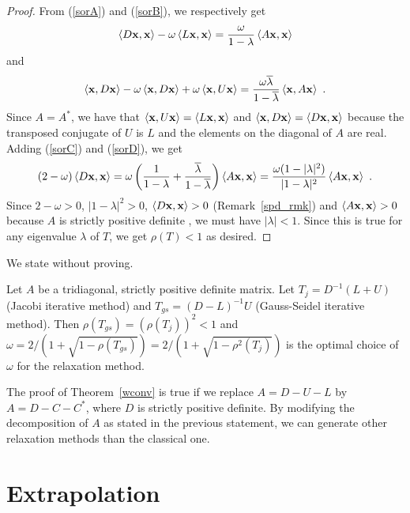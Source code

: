 \begin{proof}
From (\ref{sorA}) and (\ref{sorB}), we respectively get
\begin{equation}\label{sorC}
\left\langle{D\mathbf{x}} , {\mathbf{x}}\right\rangle - \omega \left\langle{L\mathbf{x}} , {\mathbf{x}}\right\rangle
= \frac{\omega}{1-\lambda} \left\langle{A\mathbf{x}} , {\mathbf{x}}\right\rangle
\end{equation}
and
\begin{equation}\label{sorD}
\left\langle{\mathbf{x}} , {D\mathbf{x}}\right\rangle - \omega\left\langle{\mathbf{x}} , {D\mathbf{x}}\right\rangle
+ \omega \left\langle{\mathbf{x}} , {U\mathbf{x}}\right\rangle
= \frac{\omega \overline{\lambda}}{1-\overline{\lambda}}
\left\langle{\mathbf{x}} , {A\mathbf{x}}\right\rangle \ .
\end{equation}
Since $A = A^\ast$, we have that
$\left\langle{\mathbf{x}} , {U\mathbf{x}}\right\rangle = \left\langle{L\mathbf{x}} , {\mathbf{x}}\right\rangle$ and
$\left\langle{\mathbf{x}} , {D\mathbf{x}}\right\rangle = \left\langle{D\mathbf{x}} , {\mathbf{x}}\right\rangle$ because the
transposed conjugate of $U$ is $L$ and the elements on the diagonal of
$A$ are real.  Adding (\ref{sorC}) and (\ref{sorD}), we get
\[
(2-\omega) \left\langle{D\mathbf{x}} , {\mathbf{x}}\right\rangle =
\omega \left( \frac{1}{1-\lambda} +
\frac{\overline{\lambda}}{1-\overline{\lambda}} \right) \left\langle{A\mathbf{x}} , {\mathbf{x}}\right\rangle
= \frac{\omega(1-|\lambda|^2)}{|1-\lambda|^2} \left\langle{A\mathbf{x}} , {\mathbf{x}}\right\rangle
\ .
\]
Since $2-\omega > 0$, $|1-\lambda|^2>0$,
$\left\langle{D\mathbf{x}} , {\mathbf{x}}\right\rangle > 0$ (Remark~\ref{spd_rmk}) and
$\left\langle{A\mathbf{x}} , {\mathbf{x}}\right\rangle > 0$ because $A$ is strictly positive definite
, we must have $|\lambda|<1$.  Since this is true for any
eigenvalue $\lambda$ of $T$, we get $\rho(T) < 1$ as desired.
\end{proof}

We state without proving.

\begin{theorem}
Let $A$ be a tridiagonal, strictly positive definite matrix.  Let
$T_j = D^{-1}(L+U)$ (Jacobi iterative method) and
$T_{gs} = (D-L)^{-1}U$ (Gauss-Seidel iterative method).  Then
$\rho(T_{gs}) = (\rho(T_j))^2 < 1$ and
$\omega = 2/(1+\sqrt{1-\rho(T_{gs})}) = 2/(1+\sqrt{1-\rho^2(T_j)})$
is the optimal choice of $\omega$ for the relaxation method.
\end{theorem}

\begin{rmk}
The proof of Theorem~\ref{wconv} is true if we replace $A=D-U-L$ by
$A=D-C-C^\ast$, where $D$ is strictly positive definite.  By modifying
the decomposition of $A$ as stated in the previous statement, we can
generate other relaxation methods than the classical one.
\end{rmk}

\section{Extrapolation}

